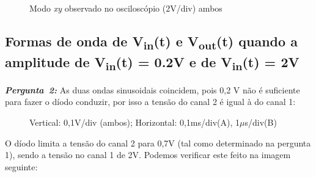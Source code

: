 \documentclass[pdftex,12pt,a4paper]{report}
\begin{document}
\begin{figure}[h]
\centerline{}
\caption{Modo \textit{xy} observado no osciloscópio (2V/div) ambos}\label{grafico_1c_osciloscopio}
\end{figure}

\clearpage
\subsection{Formas de onda de V\textsubscript{in}(t)  e V\textsubscript{out}(t) quando a amplitude de V\textsubscript{in}(t) = 0.2V e de V\textsubscript{in}(t) = 2V}
\hbox{\emph{\textbf{Pergunta 2:}}\newline}
As duas ondas sinusoidais coincidem, pois 0,2 V não é suficiente para fazer o díodo conduzir, por isso a tensão do canal 2 é igual à do canal 1:

\begin{figure}[h]
\centerline{}
\caption{Vertical: 0,1V/div (ambos); Horizontal: 0,1ms/div(A), 1$\mu$s/div(B)}\label{grafico_12_02_osciloscopio}
\end{figure}

O díodo limita a tensão do canal 2 para 0,7V (tal como determinado na pergunta 1), sendo a tensão no canal 1 de 2V. Podemos verificar este feito na imagem seguinte: 

\begin{figure}[h]
\centerline{}
\caption{}\label{grafico_12_02_osciloscopio}
\end{figure}
\end{document}
